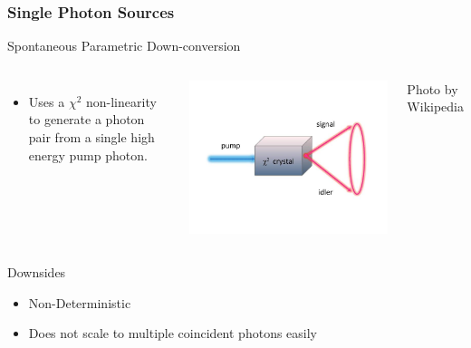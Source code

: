 \documentclass{beamer}
\begin{document}
\begin{frame}\frametitle{Single Photon Sources}
    \begin{block}{Spontaneous Parametric Down-conversion}
        \begin{columns}
            \begin{itemize}
                \item Uses a $\chi^2$ non-linearity to generate a photon pair from a single high energy pump photon.
            \end{itemize}
            \centering
            \includegraphics[width=1.0\textwidth]{Images/SPDC.jpg}

            \tiny{Photo by Wikipedia}
        \end{columns}
    \end{block}
    \begin{block}{Downsides}
        \begin{itemize}
            \item Non-Deterministic
            \item Does not scale to multiple coincident photons easily
        \end{itemize}
    \end{block}
\end{frame}
\end{document}
